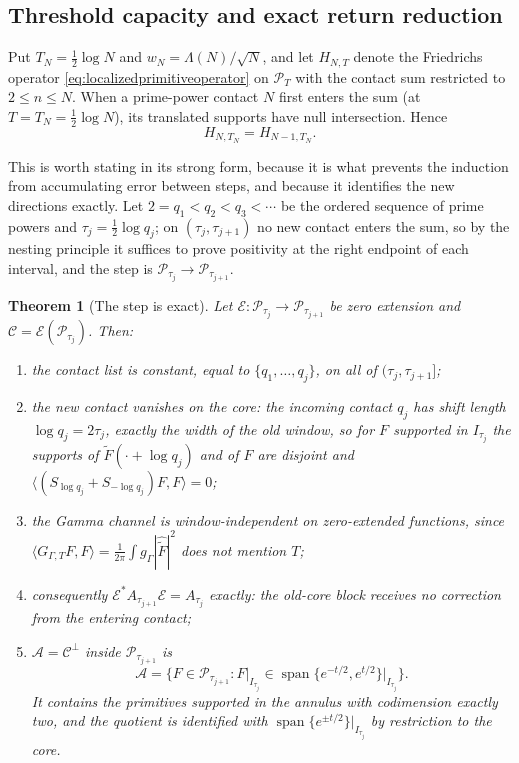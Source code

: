 \documentclass[11pt]{amsart}
\newtheorem{theorem}{Theorem}[section]
\theoremstyle{definition}
\theoremstyle{remark}
\begin{document}
\subsection{Threshold capacity and exact return reduction}
\label{subsec:thresholdcapacity}

Put \(T_N=\frac12\log N\) and
\(w_N=\Lambda(N)/\sqrt N\), and let \(H_{N,T}\) denote the Friedrichs
operator \eqref{eq:localizedprimitiveoperator} on \(\mathcal P_T\) with the
contact sum restricted to \(2\le n\le N\).  When a prime-power contact \(N\)
first enters the sum (at \(T=T_N=\frac12\log N\)),
its translated supports have null intersection.  Hence
\begin{equation}\label{eq:thresholdbirth}
 H_{N,T_N}=H_{N-1,T_N}.
\end{equation}

This is worth stating in its strong form, because it is what prevents the
induction from accumulating error between steps, and because it identifies
the new directions exactly.  Let \(2=q_1<q_2<q_3<\cdots\) be the ordered
sequence of prime powers and \(\tau_j=\frac12\log q_j\); on
\((\tau_j,\tau_{j+1})\) no new contact enters the sum, so by the nesting principle it
suffices to prove positivity at the right endpoint of each interval, and the
step is \(\mathcal P_{\tau_j}\to\mathcal P_{\tau_{j+1}}\).

\begin{theorem}[The step is exact]\label{thm:exactstep}
Let \(\mathcal E:\mathcal P_{\tau_j}\to\mathcal P_{\tau_{j+1}}\) be zero
extension and \(\mathcal C=\mathcal E(\mathcal P_{\tau_j})\).  Then:
\begin{enumerate}
\item the contact list is constant, equal to \(\{q_1,\dots,q_j\}\), on all of
\((\tau_j,\tau_{j+1}]\);
\item \emph{the new contact vanishes on the core}: the incoming contact \(q_j\) has
shift length \(\log q_j=2\tau_j\), exactly the width of the old window, so
for \(F\) supported in \(I_{\tau_j}\) the supports of
\(\widetilde F(\cdot+\log q_j)\) and of \(F\) are disjoint and
\(\langle(S_{\log q_j}+S_{-\log q_j})F,F\rangle=0\);
\item the Gamma channel is window-independent on zero-extended functions,
since \(\langle G_{\Gamma,T}F,F\rangle
 =\frac1{2\pi}\int g_\Gamma|\widehat{\widetilde F}|^2\) does not mention
\(T\);
\item consequently \(\mathcal E^*A_{\tau_{j+1}}\mathcal E=A_{\tau_j}\)
\emph{exactly}: the old-core block receives no correction from the entering
contact;
\item \(\mathcal A=\mathcal C^\perp\) inside \(\mathcal P_{\tau_{j+1}}\) is
\[
 \mathcal A=\bigl\{F\in\mathcal P_{\tau_{j+1}}:
 F|_{I_{\tau_j}}\in\operatorname{span}\{e^{-t/2},e^{t/2}\}\big|_{I_{\tau_j}}\bigr\}.
\]
It contains the primitives supported in the annulus with codimension exactly
two, and the quotient is identified with
\(\operatorname{span}\{e^{\pm t/2}\}|_{I_{\tau_j}}\) by restriction to the
core.
\end{enumerate}
\end{theorem}
\end{document}
